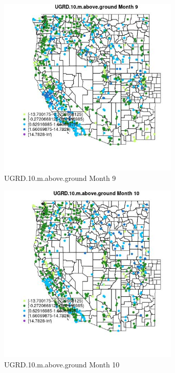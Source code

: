 \begin{figure} 
\centering  
\includegraphics[width=0.77\textwidth]{Code_Outputs/Report_ML_input_PM25_Step4_part_e_de_duplicated_aves_compiled_2019-05-21wNAs_MapObsMo9UGRD10maboveground.jpg} 
\caption{\label{fig:Report_ML_input_PM25_Step4_part_e_de_duplicated_aves_compiled_2019-05-21wNAsMapObsMo9UGRD10maboveground}UGRD.10.m.above.ground Month 9} 
\end{figure} 
 

\begin{figure} 
\centering  
\includegraphics[width=0.77\textwidth]{Code_Outputs/Report_ML_input_PM25_Step4_part_e_de_duplicated_aves_compiled_2019-05-21wNAs_MapObsMo10UGRD10maboveground.jpg} 
\caption{\label{fig:Report_ML_input_PM25_Step4_part_e_de_duplicated_aves_compiled_2019-05-21wNAsMapObsMo10UGRD10maboveground}UGRD.10.m.above.ground Month 10} 
\end{figure} 
 

